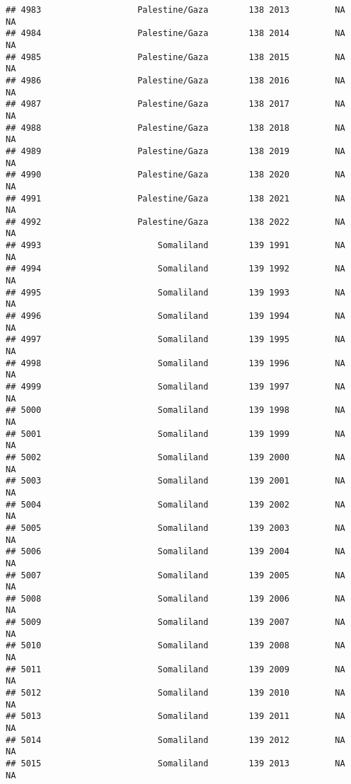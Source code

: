 \documentclass[
]{article}
\begin{document}
\begin{verbatim}
## 4983                   Palestine/Gaza        138 2013         NA         NA
## 4984                   Palestine/Gaza        138 2014         NA         NA
## 4985                   Palestine/Gaza        138 2015         NA         NA
## 4986                   Palestine/Gaza        138 2016         NA         NA
## 4987                   Palestine/Gaza        138 2017         NA         NA
## 4988                   Palestine/Gaza        138 2018         NA         NA
## 4989                   Palestine/Gaza        138 2019         NA         NA
## 4990                   Palestine/Gaza        138 2020         NA         NA
## 4991                   Palestine/Gaza        138 2021         NA         NA
## 4992                   Palestine/Gaza        138 2022         NA         NA
## 4993                       Somaliland        139 1991         NA         NA
## 4994                       Somaliland        139 1992         NA         NA
## 4995                       Somaliland        139 1993         NA         NA
## 4996                       Somaliland        139 1994         NA         NA
## 4997                       Somaliland        139 1995         NA         NA
## 4998                       Somaliland        139 1996         NA         NA
## 4999                       Somaliland        139 1997         NA         NA
## 5000                       Somaliland        139 1998         NA         NA
## 5001                       Somaliland        139 1999         NA         NA
## 5002                       Somaliland        139 2000         NA         NA
## 5003                       Somaliland        139 2001         NA         NA
## 5004                       Somaliland        139 2002         NA         NA
## 5005                       Somaliland        139 2003         NA         NA
## 5006                       Somaliland        139 2004         NA         NA
## 5007                       Somaliland        139 2005         NA         NA
## 5008                       Somaliland        139 2006         NA         NA
## 5009                       Somaliland        139 2007         NA         NA
## 5010                       Somaliland        139 2008         NA         NA
## 5011                       Somaliland        139 2009         NA         NA
## 5012                       Somaliland        139 2010         NA         NA
## 5013                       Somaliland        139 2011         NA         NA
## 5014                       Somaliland        139 2012         NA         NA
## 5015                       Somaliland        139 2013         NA         NA

\end{verbatim}
\end{document}
